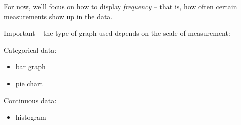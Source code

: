 \documentclass[11pt]{article}
\begin{document}
For now, we'll focus on how to display \emph{frequency} -- that is, how often certain measurements show up in the data.

Important -- the type of graph used depends on the scale of measurement:

Categorical data:
\begin{itemize}
\item bar graph
\item pie chart
\end{itemize}

Continuous data:
\begin{itemize}
\item histogram
\end{itemize}
\end{document}
